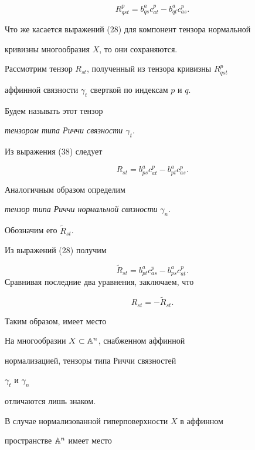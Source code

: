 \begin{equation}\label{eq:53}
R^p_{qst} = b^a_{qs} c_{at}^p - b^a_{qt} c_{as}^p.


\end{equation}


Что же касается выражений (28) для компонент тензора нормальной


кривизны многообразия $X$, то они сохраняются.





Рассмотрим тензор $R_{st}$, полученный из тензора кривизны $R^p_{qst}$


аффинной связности $\gamma_t$ сверткой по индексам $p$ и $q$.


Будем называть этот тензор


{\it тензором типа Риччи связности $\gamma_t$}.


Из выражения (38) следует


$$
R_{st} = b^a_{ps} c^p_{at} - b^a_{pt} c^p_{as}.
$$



Аналогичным образом определим


{\it тензор типа Риччи нормальной связности} $\gamma_n$.


Обозначим его $\widetilde{R}_{st}$.


Из выражений (28) получим


$$


\widetilde{R}_{st} = b^a_{pt} c^p_{as} - b^a_{ps} c^p_{at}.


$$
Сравнивая последние два уравнения, заключаем, что


$$


R_{st} = -\widetilde{R}_{st}.


$$



Таким образом, имеет место



\begin{thm}
На многообразии $X \subset \Bbb{A}^n$, снабженном аффинной


нормализацией, тензоры типа Риччи связностей


$\gamma_t$ и $\gamma_n$


отличаются лишь знаком.


\end{thm}



В случае нормализованной гиперповерхности $X$ в аффинном


пространстве $\Bbb{A}^n$ имеет место 





